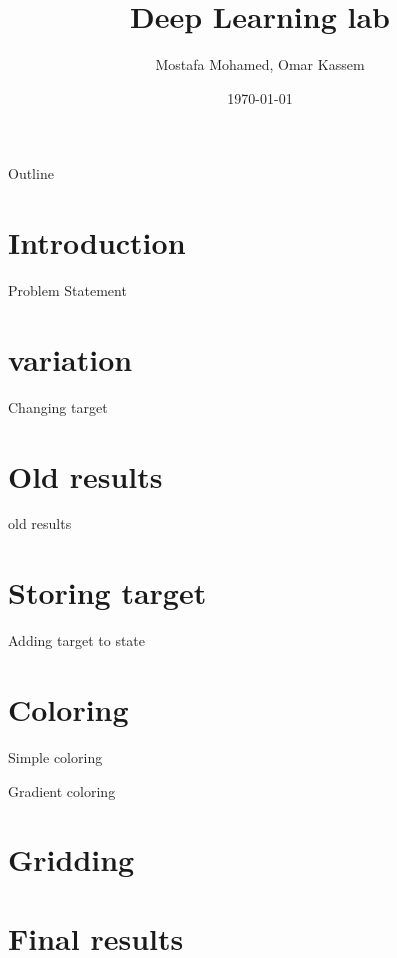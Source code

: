 \documentclass{beamer}
\title[]{Deep Learning lab}
\subtitle{}
\author[Uni-Freiburg]{Mostafa Mohamed, Omar Kassem}
\date{\today}
\institute{Alberts-Ludwig Universt\"at Freiburg}
\begin{document}
\begin{frame}
\titlepage
\end{frame}

\begin{frame}{Outline}
  \setcounter{tocdepth}{1}
  \tableofcontents
\end{frame}

\section{Introduction}
\begin{frame}{Problem Statement}
\end{frame}

\section{variation}
\begin{frame}{Changing target}
\end{frame}

\section{Old results}
\begin{frame}{old results}
\end{frame}

\section{Storing target}
\begin{frame}{Adding target to state}
\end{frame}

\section{Coloring}
\begin{frame}{Simple coloring}
\end{frame}

\begin{frame}{Gradient coloring}
\end{frame}

\section{Gridding}
\begin{frame}
\end{frame}

\section{Final results}
\begin{frame}
\end{frame}
\end{document}
